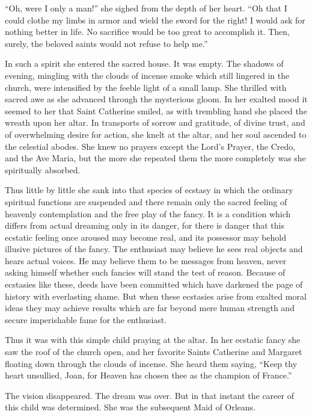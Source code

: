 ``Oh, were I only a man!'' she sighed from the depth of her heart. ``Oh
that I could clothe my limbs in armor and wield the sword for the right!
I would ask for nothing better in life. No sacrifice would be too great
to accomplish it. Then, surely, the beloved saints would not refuse to
help me.''

In such a spirit she entered the sacred house. It was empty. The shadows
of evening, mingling with the clouds of incense smoke which still
lingered in the church, were intensified by the feeble light of a small
lamp. She thrilled with sacred awe as she advanced through the
mysterious gloom. In her exalted mood it seemed to her that Saint
Catherine smiled, as with trembling hand she placed the wreath upon her
altar. In transports of sorrow and gratitude, of divine trust, and of
overwhelming desire for action, she knelt at the altar, and her soul
ascended to the celestial abodes. She knew no prayers except the Lord's
Prayer, the Credo, and the Ave Maria, but the more she repeated them the
more completely was she spiritually absorbed.

Thus little by little she sank into that species of ecstasy in which the
ordinary spiritual functions are suspended and there remain only the
sacred feeling of heavenly contemplation and the free play of the fancy.
It is a condition which differs from actual dreaming only in its danger,
for there is danger that this ecstatic feeling once aroused may become
real, and its possessor may behold illusive pictures of the fancy. The
enthusiast may believe he sees real objects and hears actual voices. He
may believe them to be messages from heaven, never asking himself
whether such fancies will stand the test of reason. Because of ecstasies
like these, deeds have been committed which have darkened the page of
history with everlasting shame. But when these ecstasies arise from
exalted moral ideas they may achieve results which are far beyond mere
human strength and secure imperishable fame for the enthusiast.

Thus it was with this simple child praying at the altar. In her ecstatic
fancy she saw the roof of the church open, and her favorite Saints
Catherine and Margaret floating down through the clouds of incense. She
heard them saying, ``Keep thy heart unsullied, Joan, for Heaven has
chosen thee as the champion of France.''

The vision disappeared. The dream was over. But in that instant the
career of this child was determined. She was the subsequent Maid of
Orleans.

\threeast
